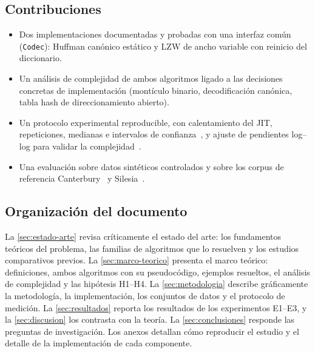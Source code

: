 \subsection{Contribuciones}
\begin{itemize}
  \item Dos implementaciones documentadas y probadas con una interfaz común
        (\texttt{Codec}): Huffman canónico estático y LZW de ancho variable con reinicio del
        diccionario.
  \item Un análisis de complejidad de ambos algoritmos ligado a las decisiones concretas de
        implementación (montículo binario, decodificación canónica, tabla hash de
        direccionamiento abierto).
  \item Un protocolo experimental reproducible, con calentamiento del JIT, repeticiones,
        medianas e intervalos de confianza~\cite{georges2007}, y ajuste de pendientes log--log
        para validar la complejidad~\cite{mcgeoch2012}.
  \item Una evaluación sobre datos sintéticos controlados y sobre los corpus de referencia
        Canterbury~\cite{arnold1997} y Silesia~\cite{deorowicz2003}.
\end{itemize}

\subsection{Organización del documento}
La \cref{sec:estado-arte} revisa críticamente el estado del arte: los fundamentos teóricos del
problema, las familias de algoritmos que lo resuelven y los estudios comparativos previos. La
\cref{sec:marco-teorico} presenta el marco teórico: definiciones, ambos algoritmos con su
pseudocódigo, ejemplos resueltos, el análisis de complejidad y las hipótesis H1--H4. La
\cref{sec:metodologia} describe gráficamente la metodología, la implementación, los conjuntos
de datos y el protocolo de medición. La \cref{sec:resultados} reporta los resultados de los
experimentos E1--E3, y la \cref{sec:discusion} los contrasta con la teoría. La
\cref{sec:conclusiones} responde las preguntas de investigación.
Los anexos detallan cómo reproducir el estudio y el detalle de la implementación de cada componente.
